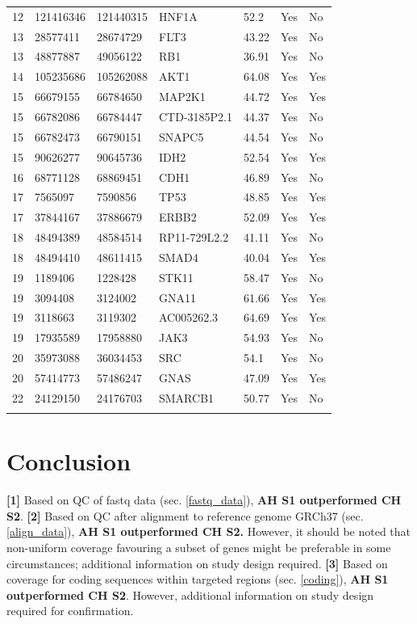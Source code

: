 \documentclass{article}
\begin{document}
\begin{center}
\begin{longtable}{ l l l l l l l}
12 & 121416346 & 121440315 & HNF1A & 52.2 & Yes & No \\
13 & 28577411 & 28674729 & FLT3 & 43.22 & Yes & No \\
13 & 48877887 & 49056122 & RB1 & 36.91 & Yes & No \\
14 & 105235686 & 105262088 & AKT1 & 64.08 & Yes & Yes \\
15 & 66679155 & 66784650 & MAP2K1 & 44.72 & Yes & Yes \\
15 & 66782086 & 66784447 & CTD-3185P2.1 & 44.37 & Yes & No \\
15 & 66782473 & 66790151 & SNAPC5 & 44.54 & Yes & No \\
15 & 90626277 & 90645736 & IDH2 & 52.54 & Yes & Yes \\
16 & 68771128 & 68869451 & CDH1 & 46.89 & Yes & No \\
17 & 7565097 & 7590856 & TP53 & 48.85 & Yes & Yes \\
17 & 37844167 & 37886679 & ERBB2 & 52.09 & Yes & Yes \\
18 & 48494389 & 48584514 & RP11-729L2.2 & 41.11 & Yes & No \\
18 & 48494410 & 48611415 & SMAD4 & 40.04 & Yes & Yes \\
19 & 1189406 & 1228428 & STK11 & 58.47 & Yes & No \\
19 & 3094408 & 3124002 & GNA11 & 61.66 & Yes & Yes \\
19 & 3118663 & 3119302 & AC005262.3 & 64.69 & Yes & Yes \\
19 & 17935589 & 17958880 & JAK3 & 54.93 & Yes & No \\
20 & 35973088 & 36034453 & SRC & 54.1 & Yes & No \\
20 & 57414773 & 57486247 & GNAS & 47.09 & Yes & Yes \\
22 & 24129150 & 24176703 & SMARCB1 & 50.77 & Yes & No \\
\hline
\label{table:2}
\end{longtable}
\end{center}

\section{Conclusion}
\label{conclusion}
\textbf{[1]} Based on QC of fastq data (sec. \ref{fastq_data}), \textbf{AH S1 outperformed CH S2}.
\textbf{[2]} Based on QC after alignment to reference genome GRCh37 (sec. \ref{align_data}), 
\textbf{AH S1 outperformed CH S2.} 
However, it should be noted that non-uniform coverage favouring a subset of genes might be preferable
in some circumstances;  additional information on study design required.
\textbf{[3]} Based on coverage for coding sequences within targeted regions (sec. \ref{coding}), \textbf{AH S1 outperformed CH S2}. 
However, additional information on study design required for confirmation.\\
\end{document}
